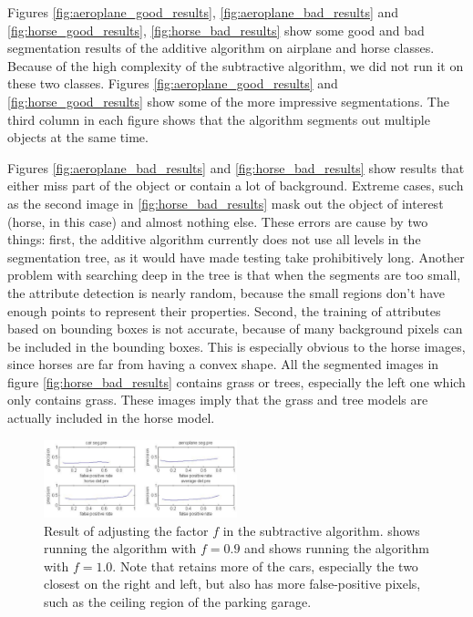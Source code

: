 \documentclass[10pt,twocolumn,letterpaper]{article}
\begin{document}
Figures \ref{fig:aeroplane_good_results}, \ref{fig:aeroplane_bad_results} and 
\ref{fig:horse_good_results}, \ref{fig:horse_bad_results} show some good and bad 
segmentation results of the additive algorithm on airplane and horse classes. Because of the
high complexity of the subtractive algorithm, we did not run it on these two classes. 
Figures \ref{fig:aeroplane_good_results} and \ref{fig:horse_good_results} show some
of the more impressive segmentations.  The third column in each figure shows that
the algorithm segments out multiple objects at the same time.

Figures \ref{fig:aeroplane_bad_results} and \ref{fig:horse_bad_results} show results
that either miss part of the object or contain a lot of background.  Extreme cases,
such as the second image in \ref{fig:horse_bad_results} mask out the object of interest
(horse, in this case) and almost nothing else.  These errors are cause by two things:
first, the additive algorithm currently does not use all levels in the segmentation tree,
as it would have made testing take prohibitively long.
Another problem with searching deep in the tree is that when the segments are too small, 
the attribute detection is nearly random, because the small regions 
don't have enough points to represent their properties. Second, the training of attributes based on
bounding boxes is not accurate, because of many background pixels can be included in the bounding boxes. 
This is especially obvious to the horse images, since horses are far from having a convex shape. 
All the segmented images in figure \ref{fig:horse_bad_results} contains grass or trees, especially the 
left one which only contains grass. These images imply that the grass and tree models are actually
included in the horse model.\\  


\begin{figure}
\centering
\includegraphics[width=0.5\textwidth]{figures/add_res/roc_seg.png.eps}
\caption{Result of adjusting the factor $f$ in the subtractive
algorithm.  shows running the algorithm with $f=0.9$
and  shows running the algorithm with $f=1.0$.  Note
that  retains more of the cars, especially the two
closest on the right and left, but also has more false-positive
pixels, such as the ceiling region of the parking garage.}
\label{fig:roc_seg}
\end{figure}
\end{document}
